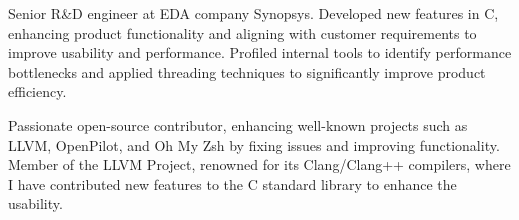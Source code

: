 

\begin{cvparagraph}

Senior R\&D engineer at EDA company Synopsys. Developed new features in C, enhancing product functionality and aligning with customer requirements to improve usability and performance. Profiled internal tools to identify performance bottlenecks and applied threading techniques to significantly improve product efficiency.

Passionate open-source contributor, enhancing well-known projects such as LLVM, OpenPilot, and Oh My Zsh by fixing issues and improving functionality. Member of the LLVM Project, renowned for its Clang/Clang++ compilers, where I have contributed new features to the C standard library to enhance the usability.
\end{cvparagraph}
